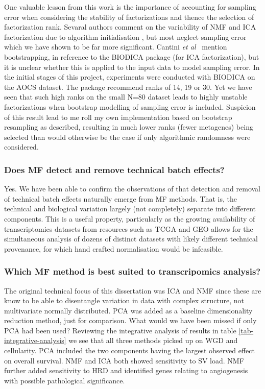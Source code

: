 \documentclass[tikz, 11pt,a4paper,oneside,fleqn]{article}
\newcommand{\etal}{{\em et al\/}}
\begin{document}
One valuable lesson from this work is the importance of accounting for sampling error  when considering the stability of factorizations and thence the selection of factorization rank.    Sevaral authors comment on the variability of NMF and ICA factorization due to algorithm initialisation \cite{Kairov2017,Sompairac2019,WayGregory2019}, but most neglect sampling error which we have shown to be far more significant.   Cantini \etal\ \cite{Cantini2019a} mention bootstrapping, in reference to the BIODICA package (for ICA factorization), but it is unclear whether this is applied to the input data to model sampling error.  In the initial stages of this project, experiments were conducted with BIODICA on the AOCS dataset.   The package recommend ranks of 14, 19 or 30.  Yet we have seen that such high ranks on the small N=80 dataset leads to highly unstable factorizations when bootstrap modelling of sampling error is included.  Suspicion of this result lead to me roll my own implementation based on bootstrap resampling as described, resulting in much lower ranks (fewer metagenes) being selected than would otherwise be the case if only algorithmic randomness were considered.

\subsubsection*{Does MF detect and remove technical batch effects?}

Yes. We have been able to confirm the observations of \cite{Zhou2018a,Renard2016,Meng2016} that detection and removal of technical  batch effects naturally emerge from MF methods.  That is, the technical and biological variation largely (not completely) separate into different components.  This is a useful property, particularly as the growing availability of transcriptomics datasets from resources such as TCGA and GEO allows for the simultaneous analysis of dozens of distinct datasets with likely different technical provenance, for which hand crafted normalisation would be infeasible.

\subsubsection*{Which MF method is best suited to transcripomics analysis?}

The original technical focus of this dissertation was ICA and NMF since these are know to be able to disentangle variation in data with complex structure, not multivariate normally distributed.  PCA was added as a baseline dimensionality reduction method, just for comparison.   What would we have been missed if only PCA had been used?  Reviewing the integrative analysis of results in table \ref{tab-integrative-analysis} we see that all three methods picked up on WGD and cellularity.  PCA included the two components having the largest observed effect on overall survival.  NMF and ICA both showed sensitivity to SV load.  NMF further added sensitivity to HRD and identified genes relating to angiogenesis with possible pathological significance.
\end{document}
